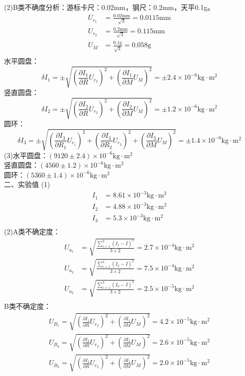 \documentclass[dvipsnames, svgnames,a4paper,11pt]{article}
\begin{document}
(2)B类不确度分析：游标卡尺：0.02mm，钢尺：0.2mm，天平0.1g。
\begin{align*}
	U_{r_1}&=\frac{0.02\text{mm}}{\sqrt{3}}=0.0115\text{mm}\\
	U_{r_2}&=\frac{0.2\text{mm}}{\sqrt{3}}=0.115\text{mm}\\
	U_{M}&=\frac{0.1\text{g}}{\sqrt{3}}=0.058\text{g}\\
\end{align*}
水平圆盘：
$$\delta I_1=\pm\sqrt{(\frac{\partial I_1}{\partial R}U_{r_2})^2+(\frac{\partial I_1}{\partial M}U_{M})^2}=\pm2.4\times10^{-6}\text{kg}\cdot\text{m}^2$$
竖直圆盘：
$$\delta I_2=\pm\sqrt{(\frac{\partial I_2}{\partial R}U_{r_2})^2+(\frac{\partial I_2}{\partial M}U_{M})^2}=\pm1.2\times10^{-6}\text{kg}\cdot\text{m}^2$$
圆环：
$$\delta I_3=\pm\sqrt{(\frac{\partial I_3}{\partial R_1}U_{r_1})^2+(\frac{\partial I_3}{\partial R_2}U_{r_2})^2+(\frac{\partial I_3}{\partial M}U_{M})^2}=\pm1.4\times10^{-6}\text{kg}\cdot\text{m}^2$$
(3)水平圆盘：$(9120\pm2.4)\times10^{-6}\text{kg}\cdot\text{m}^2$\\
竖直圆盘：$(4560\pm1.2)\times10^{-6}\text{kg}\cdot\text{m}^2$\\
圆环：$(5360\pm1.4)\times10^{-6}\text{kg}\cdot\text{m}^2$\\
二、实验值
(1)\begin{align*}
	I_1&=8.61\times10^{-3}\text{kg}\cdot\text{m}^2\\
	I_2&=4.88\times10^{-3}\text{kg}\cdot\text{m}^2\\
	I_3&=5.3\times10^{-3}\text{kg}\cdot\text{m}^2\\
\end{align*}
(2)A类不确定度：
\begin{align*}
	U_{a_1}&=\sqrt{\frac{\displaystyle\sum_{i=1}^3(I_1-\overline{I})^2}{3\times2}}=2.7\times10^{-4}\text{kg}\cdot\text{m}^2\\
	U_{a_2}&=\sqrt{\frac{\displaystyle\sum_{i=1}^3(I_2-\overline{I})^2}{3\times2}}=7.5\times10^{-4}\text{kg}\cdot\text{m}^2\\
	U_{a_3}&=\sqrt{\frac{\displaystyle\sum_{i=1}^3(I_3-\overline{I})^2}{3\times2}}=2.5\times10^{-5}\text{kg}\cdot\text{m}^2\\
\end{align*}
B类不确定度：
\begin{align*}
	U_{B_1}=\sqrt{(\frac{\partial I_1}{\partial R}U_{r_2})^2+(\frac{\partial I_1}{\partial M}U_{M})^2}=4.2\times10^{-5}\text{kg}\cdot\text{m}^2\\
	U_{B_2}=\sqrt{(\frac{\partial I_2}{\partial R}U_{r_2})^2+(\frac{\partial I_2}{\partial M}U_{M})^2}=2.6\times10^{-5}\text{kg}\cdot\text{m}^2\\
	U_{B_3}=\sqrt{(\frac{\partial I_3}{\partial R}U_{r_2})^2+(\frac{\partial I_3}{\partial M}U_{M})^2}=2.0\times10^{-5}\text{kg}\cdot\text{m}^2\\
\end{align*}
\end{document}
